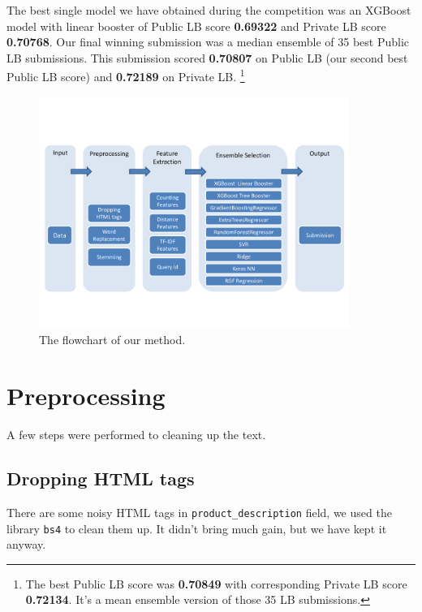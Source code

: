 \documentclass[12pt]{article}
\begin{document}
The best single model we have obtained during the competition was an XGBoost model with linear booster of Public LB score \textbf{0.69322} and Private LB score \textbf{0.70768}. Our final winning submission was a median ensemble of 35 best Public LB submissions. This submission scored \textbf{0.70807} on Public LB (our second best Public LB score) and \textbf{0.72189} on Private LB. \footnote{The best Public LB score was \textbf{0.70849} with corresponding Private LB score \textbf{0.72134}. It's a mean ensemble version of those 35 LB submissions.}

\begin{figure}[!htb]
\centering
\includegraphics[width=0.9\textwidth]{./FlowChart.pdf}
\caption{The flowchart of our method.}
\label{fig:Flowchart}
\end{figure}

\section{Preprocessing}
A few steps were performed to cleaning up the text.
\subsection{Dropping HTML tags}
There are some noisy HTML tags in \texttt{product\_description} field, we used the library \texttt{bs4} to clean them up. It didn't bring much gain, but we have kept it anyway.
\end{document}
